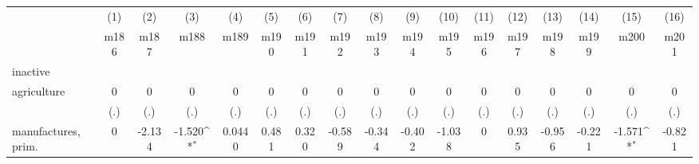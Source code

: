 {
\def\sym#1{\ifmmode^{#1}\else\(^{#1}\)\fi}
\begin{tabular}{l*{16}{c}}
\hline\hline
                    &\multicolumn{1}{c}{(1)}&\multicolumn{1}{c}{(2)}&\multicolumn{1}{c}{(3)}&\multicolumn{1}{c}{(4)}&\multicolumn{1}{c}{(5)}&\multicolumn{1}{c}{(6)}&\multicolumn{1}{c}{(7)}&\multicolumn{1}{c}{(8)}&\multicolumn{1}{c}{(9)}&\multicolumn{1}{c}{(10)}&\multicolumn{1}{c}{(11)}&\multicolumn{1}{c}{(12)}&\multicolumn{1}{c}{(13)}&\multicolumn{1}{c}{(14)}&\multicolumn{1}{c}{(15)}&\multicolumn{1}{c}{(16)}\\
                    &\multicolumn{1}{c}{m186}&\multicolumn{1}{c}{m187}&\multicolumn{1}{c}{m188}&\multicolumn{1}{c}{m189}&\multicolumn{1}{c}{m190}&\multicolumn{1}{c}{m191}&\multicolumn{1}{c}{m192}&\multicolumn{1}{c}{m193}&\multicolumn{1}{c}{m194}&\multicolumn{1}{c}{m195}&\multicolumn{1}{c}{m196}&\multicolumn{1}{c}{m197}&\multicolumn{1}{c}{m198}&\multicolumn{1}{c}{m199}&\multicolumn{1}{c}{m200}&\multicolumn{1}{c}{m201}\\
\hline
inactive            &                     &                     &                     &                     &                     &                     &                     &                     &                     &                     &                     &                     &                     &                     &                     &                     \\
agriculture         &           0         &           0         &           0         &           0         &           0         &           0         &           0         &           0         &           0         &           0         &           0         &           0         &           0         &           0         &           0         &           0         \\
                    &         (.)         &         (.)         &         (.)         &         (.)         &         (.)         &         (.)         &         (.)         &         (.)         &         (.)         &         (.)         &         (.)         &         (.)         &         (.)         &         (.)         &         (.)         &         (.)         \\
[1em]
manufactures, prim. &           0         &      -2.134         &      -1.520\sym{*}  &      0.0440         &       0.481         &       0.320         &      -0.589         &      -0.344         &      -0.402         &      -1.038         &           0         &       0.935         &      -0.956         &      -0.221         &      -1.571\sym{*}  &      -0.821         \\

\end{tabular}}
